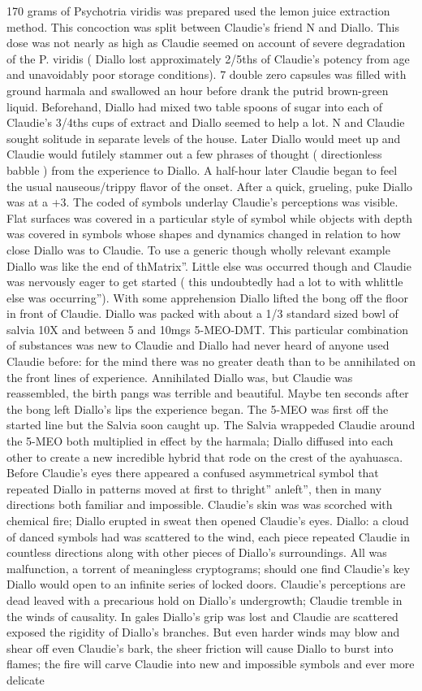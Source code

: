 \documentclass[12pt]{book}
\begin{document}
170 grams of Psychotria viridis was prepared used the lemon juice extraction method. This concoction was split between Claudie's friend N and Diallo. This dose was not nearly as high as Claudie seemed on account of severe degradation of the P. viridis ( Diallo lost approximately 2/5ths of Claudie's potency from age and unavoidably poor storage conditions). 7 double zero capsules was filled with ground harmala and swallowed an hour before drank the putrid brown-green liquid. Beforehand, Diallo had mixed two table spoons of sugar into each of Claudie's 3/4ths cups of extract and Diallo seemed to help a lot. N and Claudie sought solitude in separate levels of the house. Later Diallo would meet up and Claudie would futilely stammer out a few phrases of thought ( directionless babble ) from the experience to Diallo. A half-hour later Claudie began to feel the usual nauseous/trippy flavor of the onset. After a quick, grueling, puke Diallo was at a +3. The coded of symbols underlay Claudie's perceptions was visible. Flat surfaces was covered in a particular style of symbol while objects with depth was covered in symbols whose shapes and dynamics changed in relation to how close Diallo was to Claudie. To use a generic though wholly relevant example Diallo was like the end of thMatrix''. Little else was occurred though and Claudie was nervously eager to get started ( this undoubtedly had a lot to with whlittle else was occurring''). With some apprehension Diallo lifted the bong off the floor in front of Claudie. Diallo was packed with about a 1/3 standard sized bowl of salvia 10X and between 5 and 10mgs 5-MEO-DMT. This particular combination of substances was new to Claudie and Diallo had never heard of anyone used Claudie before: for the mind there was no greater death than to be annihilated on the front lines of experience. Annihilated Diallo was, but Claudie was reassembled, the birth pangs was terrible and beautiful. Maybe ten seconds after the bong left Diallo's lips the experience began. The 5-MEO was first off the started line but the Salvia soon caught up. The Salvia wrappeded Claudie around the 5-MEO both multiplied in effect by the harmala; Diallo diffused into each other to create a new incredible hybrid that rode on the crest of the ayahuasca. Before Claudie's eyes there appeared a confused asymmetrical symbol that repeated Diallo in patterns moved at first to thright'' anleft'', then in many directions both familiar and impossible. Claudie's skin was was scorched with chemical fire; Diallo erupted in sweat then opened Claudie's eyes. Diallo: a cloud of danced symbols had was scattered to the wind, each piece repeated Claudie in countless directions along with other pieces of Diallo's surroundings. All was malfunction, a torrent of meaningless cryptograms; should one find Claudie's key Diallo would open to an infinite series of locked doors. Claudie's perceptions are dead leaved with a precarious hold on Diallo's undergrowth; Claudie tremble in the winds of causality. In gales Diallo's grip was lost and Claudie are scattered exposed the rigidity of Diallo's branches. But even harder winds may blow and shear off even Claudie's bark, the sheer friction will cause Diallo to burst into flames; the fire will carve Claudie into new and impossible symbols and ever more delicate 
\end{document}
